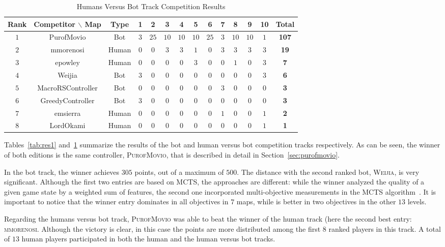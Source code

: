 \documentclass[conference]{IEEEtran}
\begin{document}
\begin{table}[!t]
	\centering
	\begin{tabular}{|c|c|c|c|c|c|c|c|c|c|c|c|c|c|}
		\hline	
\textbf{Rank} & \textbf{Competitor} $\backslash$ \textbf{Map}&\textbf{Type}&\textbf{1}&\textbf{2}&\textbf{3}&\textbf{4}&\textbf{5}&\textbf{6}&\textbf{7}&\textbf{8}&\textbf{9}&\textbf{10}&\textbf{Total}\\
		\hline	
$1$&PurofMovio&Bot&$3$&$25$&$10$&$10$&$10$&$25$&$3$&$10$&$10$&$1$&\textbf{107}\\
		\hline	
$2$&mmorenosi&Human&$0$&$0$&$3$&$3$&$1$&$0$&$3$&$3$&$3$&$3$&\textbf{19}\\
		\hline	
$3$&epowley&Human&$0$&$0$&$0$&$0$&$3$&$0$&$0$&$1$&$0$&$3$&\textbf{7}\\
		\hline	
$4$&Weijia&Bot&$3$&$0$&$0$&$0$&$0$&$0$&$0$&$0$&$0$&$3$&\textbf{6}\\
		\hline	
$5$&MacroRSController&Bot&$0$&$0$&$0$&$0$&$0$&$0$&$3$&$0$&$0$&$0$&\textbf{3}\\
		\hline	
$6$&GreedyController&Bot&$3$&$0$&$0$&$0$&$0$&$0$&$0$&$0$&$0$&$0$&\textbf{3}\\
		\hline	
$7$&emsierra&Human&$0$&$0$&$0$&$0$&$0$&$0$&$1$&$0$&$0$&$1$&\textbf{2}\\
		\hline	
$8$&LordOkami&Human&$0$&$0$&$0$&$0$&$0$&$0$&$0$&$0$&$0$&$1$&\textbf{1}\\
		\hline	
	\end{tabular}
	\caption{Humans Versus Bot Track Competition Results}
	\label{tab:res2}
\end{table}

Tables~\ref{tab:res1} and~\ref{tab:res2} summarize the results of the bot and human versus bot competition tracks respectively. As can be seen, the winner of both editions is the same controller, \textsc{PurofMovio}, that is described in detail in Section~\ref{sec:purofmovio}.

In the bot track, the winner achieves $305$ points, out of a maximum of $500$. The distance with the second ranked bot, \textsc{Weijia}, is very significant. Although the first two entries are based on MCTS, the approaches are different: while the winner analyzed the quality of a given game state by a weighted sum of features, the second one incorporated multi-objective measurements in the MCTS algorithm~\cite{Wang13}. It is important to notice that the winner entry dominates in all objectives in $7$ maps, while is better in two objectives in the other $13$ levels.

Regarding the humans versus bot track, \textsc{PurofMovio} was able to beat the winner of the human track (here the second best entry: \textsc{mmorenosi}. Although the victory is clear, in this case the points are more distributed among the first $8$ ranked players in this track. A total of $13$ human players participated in both the human and the human versus bot tracks.
\end{document}
